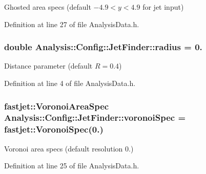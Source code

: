 Ghosted area specs (default $ -4.9 < y < 4.9 $ for jet input) 



Definition at line 27 of file Analysis\+Data.\+h.

\subsubsection[{\texorpdfstring{radius}{radius}}]{\setlength{\rightskip}{0pt plus 5cm}double Analysis\+::\+Config\+::\+Jet\+Finder\+::radius = 0.\hspace{0.3cm}{\ttfamily [static]}}\hypertarget{namespaceAnalysis_1_1Config_1_1JetFinder_af8dfcbb2cc7b1fd0d76546cc4b2984bd}{}\label{namespaceAnalysis_1_1Config_1_1JetFinder_af8dfcbb2cc7b1fd0d76546cc4b2984bd}


Distance parameter (default $ R = 0.4 $) 



Definition at line 4 of file Analysis\+Data.\+h.

\subsubsection[{\texorpdfstring{voronoi\+Spec}{voronoiSpec}}]{\setlength{\rightskip}{0pt plus 5cm}fastjet\+::\+Voronoi\+Area\+Spec Analysis\+::\+Config\+::\+Jet\+Finder\+::voronoi\+Spec = fastjet\+::\+Voronoi\+Spec(0.)\hspace{0.3cm}{\ttfamily [static]}}\hypertarget{namespaceAnalysis_1_1Config_1_1JetFinder_a63a996b81ad4a7216c5652fb216c0ed2}{}\label{namespaceAnalysis_1_1Config_1_1JetFinder_a63a996b81ad4a7216c5652fb216c0ed2}


Voronoi area specs (default resolution 0.) 



Definition at line 25 of file Analysis\+Data.\+h.

